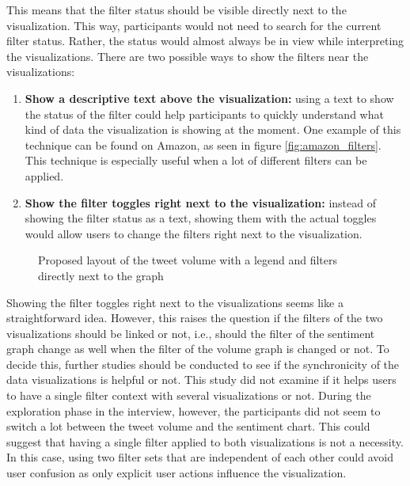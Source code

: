 This means that the filter status should be visible directly next to the visualization. This way, participants would not need to search for the current filter status. Rather, the status would almost always be in view while interpreting the visualizations. There are two possible ways to show the filters near the visualizations:
\begin{enumerate}
    \item \textbf{Show a descriptive text above the visualization:} using a text to show the status of the filter could help participants to quickly understand what kind of data the visualization is showing at the moment. One example of this technique can be found on Amazon, as seen in figure \ref{fig:amazon_filters}. This technique is especially useful when a lot of different filters can be applied.
    \item \textbf{Show the filter toggles right next to the visualization:} instead of showing the filter status as a text, showing them with the actual toggles would allow users to change the filters right next to the visualization.
\end{enumerate}

\begin{figure}[h!tbp]
    \caption{Proposed layout of the tweet volume with a legend and filters directly next to the graph}
    \label{fig:legend_and_filters}
\end{figure}

Showing the filter toggles right next to the visualizations seems like a straightforward idea. However, this raises the question if the filters of the two visualizations should be linked or not, i.e., should the filter of the sentiment graph change as well when the filter of the volume graph is changed or not. To decide this, further studies should be conducted to see if the synchronicity of the data visualizations is helpful or not. This study did not examine if it helps users to have a single filter context with several visualizations or not. During the exploration phase in the interview, however, the participants did not seem to switch a lot between the tweet volume and the sentiment chart. This could suggest that having a single filter applied to both visualizations is not a necessity. In this case, using two filter sets that are independent of each other could avoid user confusion as only explicit user actions influence the visualization.

